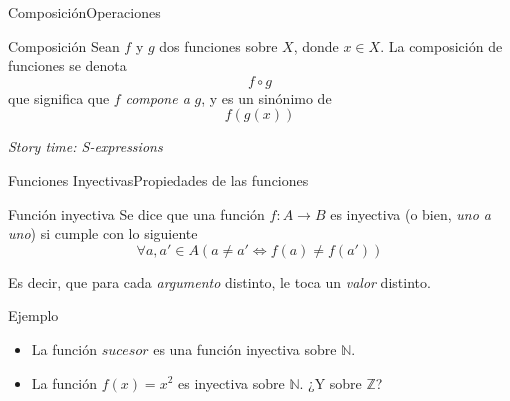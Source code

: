 \documentclass[spanish, c]{beamer}
\begin{document}
\begin{frame}{Composición}{Operaciones}

    \begin{block}{Composición}
        Sean $f$ y $g$ dos funciones sobre $X$, donde $x \in X$. La \alert{composición} de funciones se denota
        $$f \circ g$$
        que significa que $f$ \textit{compone a} $g$, y es un sinónimo de
        $$f(g(x))$$
    \end{block}

    \bigskip

    \begin{center}
        \textit{Story time: S-expressions}
    \end{center}

\end{frame}

\begin{frame}{Funciones Inyectivas}{Propiedades de las funciones}
    
    \begin{block}{Función inyectiva}
        Se dice que una función $f: A \to B$ es \alert{inyectiva} (o bien, \textit{uno a uno}) si cumple con lo siguiente
        $$\forall a, a' \in A \left(a \neq a' \iff f(a) \neq f(a') \right)$$
    \end{block} \pause

    \bigskip

    Es decir, que para cada \textit{argumento} distinto, le toca un \textit{valor} distinto. \pause

    \bigskip

    \begin{exampleblock}{Ejemplo}
        \begin{itemize}
            \item La función $sucesor$ es una función inyectiva sobre $\mathbb{N}$. \pause
            \item La función $f(x) = x^2$ es inyectiva sobre $\mathbb{N}$. ¿Y sobre $\mathbb{Z}$?
        \end{itemize}
    \end{exampleblock}

\end{frame}
\end{document}
